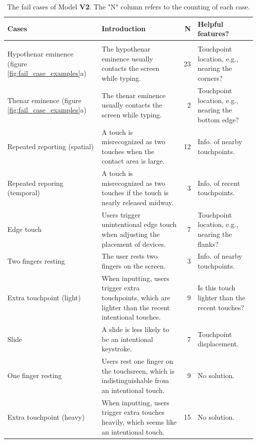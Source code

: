 \begin{table}[htbp]
  \centering
  \caption{The fail cases of Model \textbf{V2}. The "N" column refers to the counting of each case.}
    \begin{tabular}{|p{8.5em}|p{21em}|r|p{10.5em}|}
    \toprule
    \textbf{Cases} & \textbf{Introduction} & {\textbf{N}} & \textbf{Helpful features?} \\
    \midrule
    \rowcolor[rgb]{ 1,  .902,  .6} \multicolumn{4}{|l|}{\textbf{False Positives}} \\
    \midrule
    Hypothenar eminence (figure \ref{fig:fail_case_examples}a) & The hypothenar eminence usually contacts the screen while typing. & 23    & Touchpoint location, e.g., nearing the corners? \\
    \midrule
    Thenar eminence (figure \ref{fig:fail_case_examples}a) & The thenar eminence usually contacts the screen while typing. & 2     & Touchpoint location, e.g., nearing the bottom edge? \\
    \midrule
    Repeated reporting (spatial) & A touch is misrecognized as two touches when the contact area is large. & 12    & Info. of nearby touchpoints. \\
    \midrule
    Repeated reporing (temporal) & A touch is misrecognized as two touches if the touch is nearly released midway. & 3     & Info. of recent touchpoints. \\
    \midrule
    Edge touch & Users trigger unintentional edge touch when adjusting the placement of devices. & 7     & Touchpoint location, e.g., nearing the flanks? \\
    \midrule
    Two fingers resting & The user rests two fingers on the screen. & 3     & Info. of nearby touchpoints. \\
    \midrule
    Extra touchpoint (light) & When inputting, users trigger extra touchpoints, which are lighter than the recent intentional touches. & 9     & Is this touch lighter than the recent touches? \\
    \midrule
    Slide & A slide is less likely to be an intentional keystroke. & 7     & Touchpoint displacement. \\
    \midrule
    \rowcolor[rgb]{ .949,  .949,  .949} One finger resting & Users rest one finger on the touchsreen, which is indistinguishable from an intentional touch. & 9     & No solution. \\
    \midrule
    \rowcolor[rgb]{ .949,  .949,  .949} Extra touchpoint (heavy) & When inputting, users trigger extra touches heavily, which seems like an intentional touch. & 15    & No solution. \\

\end{tabular}
\end{table}
